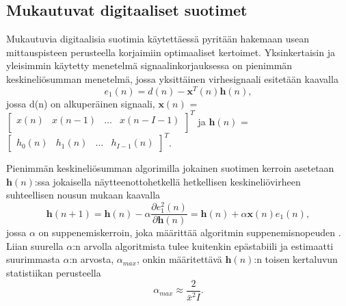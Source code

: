 \documentclass[finnish,12pt]{article}
\begin{document}
\subsection{Mukautuvat digitaaliset suotimet}

Mukautuvia digitaalisia suotimia käytettäessä pyritään hakemaan usean mittauspisteen perusteella korjaimiin optimaaliset kertoimet. Yksinkertaisin ja yleisimmin käytetty menetelmä signaalinkorjauksessa on pienimmän keskineliösumman menetelmä, jossa yksittäinen virhesignaali esitetään kaavalla \begin{equation}
e_1(n) = d(n) - \textbf{x}^T(n) \textbf{h}(n),
\end{equation} jossa
\newline
d(n) on alkuperäinen signaali,
\newline
$\textbf{x}(n)$ = $\begin{bmatrix}
x(n) & x(n-1) & \hdots & x(n-I-1) \\
\end{bmatrix}^T$ ja
\newline
$\textbf{h}(n)$ = $\begin{bmatrix}
h_0(n) & h_1(n) & \hdots & h_{I-1}(n)
\end{bmatrix}^T$.

Pienimmän keskineliösumman algorimilla jokainen suotimen kerroin asetetaan $\textbf{h}(n)$:ssa jokaisella näytteenottohetkellä hetkellisen keskineliövirheen suhteellisen nousun mukaan kaavalla \begin{equation} \label{adaptive single channel LMS}
\textbf{h}(n+1) = \textbf{h}(n) - \alpha \frac{\partial e_1^2(n)}{\partial \textbf{h}(n)} = \textbf{h}(n) + \alpha \textbf{x}(n) e_1(n),
\end{equation} jossa $\alpha$ on suppenemiskerroin, joka määrittää algoritmin suppenemisnopeuden \cite{S.J.Elliot1989}. Liian suurella $\alpha$:n arvolla algoritmista tulee kuitenkin epästabiili ja estimaatti suurimmasta $\alpha$:n arvosta, $\alpha_{max}$, onkin määritettävä $\textbf{h}(n)$:n toisen kertaluvun statistiikan perusteella \cite{S.J.Elliot1989} \begin{equation}
\alpha_{max} \approx \frac{2}{\bar{x}^2 I}.
\end{equation}
\end{document}

